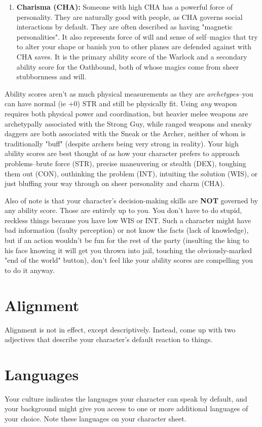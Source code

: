 \begin{enumerate}
	\item \textbf{Charisma (CHA):} Someone with high CHA has a powerful force of personality. They are naturally good with people, as CHA governs social interactions by default. They are often described as having "magnetic personalities". It also represents force of will and sense of self--magics that try to alter your shape or banish you to other planes are defended against with CHA saves. It is the primary ability score of the Warlock and a secondary ability score for the Oathbound, both of whose magics come from sheer stubbornness and will.
\end{enumerate}
	
Ability scores aren't as much physical measurements as they are \textit{archetypes}--you can have normal (ie +0) STR and still be physically fit. Using \textit{any} weapon requires both physical power and coordination, but heavier melee weapons are archetypally associated with the Strong Guy, while ranged weapons and sneaky daggers are both associated with the Sneak or the Archer, neither of whom is traditionally "buff" (despite archers being very strong in reality). Your high ability scores are best thought of as how your character prefers to approach problems--brute force (STR), precise maneuvering or stealth (DEX), toughing them out (CON), outhinking the problem (INT), intuiting the solution (WIS), or just bluffing your way through on sheer personality and charm (CHA).

Also of note is that your character's decision-making skills are \textbf{NOT} governed by any ability score. Those are entirely up to you. You don't have to do stupid, reckless things because you have low WIS or INT. Such a character might have bad information (faulty perception) or not know the facts (lack of knowledge), but if an action wouldn't be fun for the rest of the party (insulting the king to his face knowing it will get you thrown into jail, touching the obviously-marked "end of the world" button), don't feel like your ability scores are compelling you to do it anyway.

\section{Alignment}
\label{sec:alignment}
Alignment is not in effect, except descriptively. Instead, come up with two adjectives that describe your character's default reaction to things. 

\section{Languages}
\label{sec:languages}
Your culture indicates the languages your character can speak by default, and your background might give you access to one or more additional languages of your choice. Note these languages on your character sheet.

